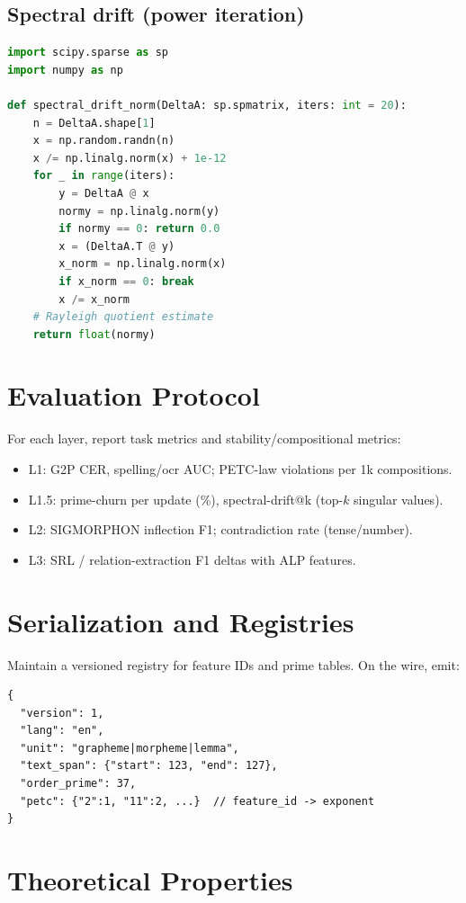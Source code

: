 \documentclass[11pt]{article}
\begin{document}
\subsection{Spectral drift (power iteration)}
\begin{lstlisting}[language=Python,caption={Estimate ||ΔA||_2 by power iteration}]
import scipy.sparse as sp
import numpy as np

def spectral_drift_norm(DeltaA: sp.spmatrix, iters: int = 20):
    n = DeltaA.shape[1]
    x = np.random.randn(n)
    x /= np.linalg.norm(x) + 1e-12
    for _ in range(iters):
        y = DeltaA @ x
        normy = np.linalg.norm(y)
        if normy == 0: return 0.0
        x = (DeltaA.T @ y)
        x_norm = np.linalg.norm(x)
        if x_norm == 0: break
        x /= x_norm
    # Rayleigh quotient estimate
    return float(normy)
\end{lstlisting}

\section{Evaluation Protocol}
For each layer, report task metrics and stability/compositional metrics:
\begin{itemize}[leftmargin=2em]
  \item L1: G2P CER, spelling/ocr AUC; PETC-law violations per 1k compositions.
  \item L1.5: prime-churn per update (\%), spectral-drift@k (top-$k$ singular values).
  \item L2: SIGMORPHON inflection F1; contradiction rate (tense/number).
  \item L3: SRL / relation-extraction F1 deltas with ALP features.
\end{itemize}

\section{Serialization and Registries}
Maintain a versioned registry for feature IDs and prime tables. On the wire, emit:
\begin{verbatim}
{
  "version": 1,
  "lang": "en",
  "unit": "grapheme|morpheme|lemma",
  "text_span": {"start": 123, "end": 127},
  "order_prime": 37,
  "petc": {"2":1, "11":2, ...}  // feature_id -> exponent
}
\end{verbatim}

\section{Theoretical Properties}
\end{document}
